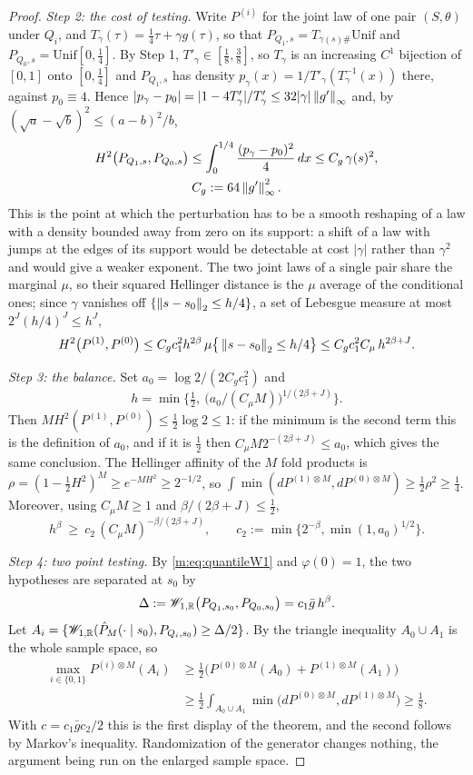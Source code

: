 \begin{proof}
\emph{Step 2: the cost of testing.} Write $P^{(i)}$ for the joint law of one pair $(S,\theta)$ under $Q_i$, and $T_\gamma(\tau)=\frac14\tau+\gamma g(\tau)$, so that $P_{Q_1,s}=T_{\gamma(s)\#}\mathrm{Unif}$ and $P_{Q_0,s}=\mathrm{Unif}[0,\frac14]$. By Step 1, $T'_\gamma\in[\frac18,\frac38]$, so $T_\gamma$ is an increasing $C^1$ bijection of $[0,1]$ onto $[0,\frac14]$ and $P_{Q_1,s}$ has density $p_\gamma(x)=1/T'_\gamma(T^{-1}_\gamma(x))$ there, against $p_0\equiv4$. Hence $|p_\gamma-p_0|=|1-4T'_\gamma|/T'_\gamma\le32|\gamma|\left\|g'\right\|_\infty$ and, by $(\sqrt a-\sqrt b)^2\le(a-b)^2/b$,
\[
\begin{gathered}
H^2\big(P_{Q_1,s},P_{Q_0,s}\big)\le\int_0^{1/4}\frac{(p_\gamma-p_0)^2}{4}\,dx\le C_g\,\gamma(s)^2,\\
C_g:=64\left\|g'\right\|_\infty^2 .
\end{gathered}
\]
This is the point at which the perturbation has to be a smooth reshaping of a law with a density bounded away from zero on its support: a shift of a law with jumps at the edges of its support would be detectable at cost $|\gamma|$ rather than $\gamma^2$ and would give a weaker exponent. The two joint laws of a single pair share the marginal $\mu$, so their squared Hellinger distance is the $\mu$ average of the conditional ones; since $\gamma$ vanishes off $\{\left\|s-s_0\right\|_2\le h/4\}$, a set of Lebesgue measure at most $2^J(h/4)^J\le h^J$,
\[
H^2\big(P^{(1)},P^{(0)}\big)\le C_gc_1^2h^{2\beta}\,\mu\big\{\left\|s-s_0\right\|_2\le h/4\big\}\le C_gc_1^2C_\mu\,h^{2\beta+J} .
\]

\emph{Step 3: the balance.} Set $a_0=\log2/(2C_gc_1^2)$ and
\[
h=\min\Big\{\tfrac12,\ \big(a_0/(C_\mu M)\big)^{1/(2\beta+J)}\Big\} .
\]
Then $MH^2(P^{(1)},P^{(0)})\le\frac12\log2\le1$: if the minimum is the second term this is the definition of $a_0$, and if it is $\frac12$ then $C_\mu M2^{-(2\beta+J)}\le a_0$, which gives the same conclusion. The Hellinger affinity of the $M$ fold products is $\rho=(1-\frac12H^2)^M\ge e^{-MH^2}\ge2^{-1/2}$, so $\int\min(dP^{(1)\otimes M},dP^{(0)\otimes M})\ge\frac12\rho^2\ge\frac14$. Moreover, using $C_\mu M\ge1$ and $\beta/(2\beta+J)\le\frac12$,
\[
h^\beta\ \ge\ c_2\,(C_\mu M)^{-\beta/(2\beta+J)},\qquad c_2:=\min\big\{2^{-\beta},\min(1,a_0)^{1/2}\big\} .
\]

\emph{Step 4: two point testing.} By \eqref{m:eq:quantileW1} and $\varphi(0)=1$, the two hypotheses are separated at $s_0$ by
\[
\Delta:=\mathscr{W}_{1,\mathbb{R}}\big(P_{Q_1,s_0},P_{Q_0,s_0}\big)=c_1\bar g\,h^\beta .
\]
Let $A_i=\{\mathscr{W}_{1,\mathbb{R}}(\hat P_M(\cdot\mid s_0),P_{Q_i,s_0})\ge\Delta/2\}$. By the triangle inequality $A_0\cup A_1$ is the whole sample space, so
\[
\begin{aligned}
\max_{i\in\{0,1\}}P^{(i)\otimes M}(A_i)&\ge\tfrac12\Big(P^{(0)\otimes M}(A_0)+P^{(1)\otimes M}(A_1)\Big)\\
&\ge\tfrac12\int_{A_0\cup A_1}\min\big(dP^{(0)\otimes M},dP^{(1)\otimes M}\big)\ge\tfrac18 .
\end{aligned}
\]
With $c=c_1\bar gc_2/2$ this is the first display of the theorem, and the second follows by Markov's inequality. Randomization of the generator changes nothing, the argument being run on the enlarged sample space.


\end{proof}
